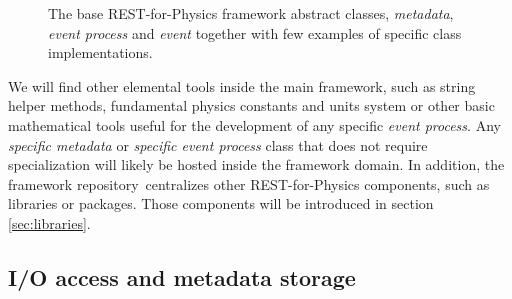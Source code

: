 \begin{figure}[]
  \centering
	\caption{The base REST-for-Physics framework abstract classes, 
	\emph{metadata}, \emph{event process} and \emph{event} together with few examples of specific class implementations.}  \label{fig:objects}
\end{figure}

We will find other elemental tools inside the main framework, such as string helper methods, fundamental physics constants and units system or other basic mathematical tools useful for the development of any specific \emph{event process}. Any \emph{specific metadata} or \emph{specific event process} class that does not require specialization will likely be hosted inside the framework domain.
 In addition, the framework repository\,\cite{REST_Framework_Git} centralizes other REST-for-Physics components, such as libraries or packages. Those components will be introduced in section\,\ref{sec:libraries}.%





\subsection{I/O access and metadata storage}



